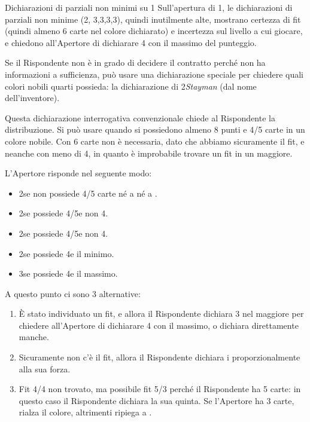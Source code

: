 \documentclass[../corsofiori.tex]{subfiles}
\begin{document}
\vspace{1cm}

\begin{regola}{Dichiarazioni di parziali non minimi su 1\SA}
    Sull'apertura di 1\SA, le dichiarazioni di parziali non minime (2\SA, 3\Cl,3\Di,3\He,3\Sp), quindi inutilmente alte,
    mostrano certezza di fit (quindi almeno 6 carte nel colore dichiarato) e incertezza
    sul livello a cui giocare, e chiedono all'Apertore di dichiarare 4 con il massimo del punteggio.
\end{regola}

Se il Rispondente non è in grado di decidere il contratto perché non ha informazioni a sufficienza, può usare una
dichiarazione speciale per chiedere quali colori nobili quarti possieda: la dichiarazione di 2\Cl \emph{Stayman} (dal
nome dell'inventore).

Questa dichiarazione interrogativa convenzionale chiede al Rispondente la distribuzione. Si può usare quando si
possiedono almeno 8 punti e 4/5 carte in un colore nobile. Con 6 carte non è necessaria, dato che abbiamo sicuramente il
fit, e neanche con meno di 4, in quanto è improbabile trovare un fit in un maggiore.

L'Apertore risponde nel seguente modo:
\begin{itemize}
    \item 2\Di se non possiede 4/5 carte né a \cu né a \pic.
    \item 2\He se possiede 4/5\He e non 4\He.
    \item 2\Sp se possiede 4/5\Sp e non 4\Sp.
    \item 2\SA se possiede 4\He e il minimo.
    \item 3\Cl se possiede 4\He e il massimo.
\end{itemize}

A questo punto ci sono 3 alternative:
\begin{enumerate}
    \item \`E stato individuato un fit, e allora il Rispondente dichiara 3 nel maggiore per chiedere all'Apertore di
        dichiarare 4 con il massimo, o dichiara direttamente manche.
    \item Sicuramente non c'è il fit, allora il Rispondente dichiara i \SA proporzionalmente alla sua forza.
    \item Fit 4/4 non trovato, ma possibile fit 5/3 perché il Rispondente ha 5 carte: in questo caso il Rispondente
        dichiara la sua quinta. Se l'Apertore ha 3 carte, rialza il colore, altrimenti ripiega a \SA.
\end{enumerate}
\end{document}
